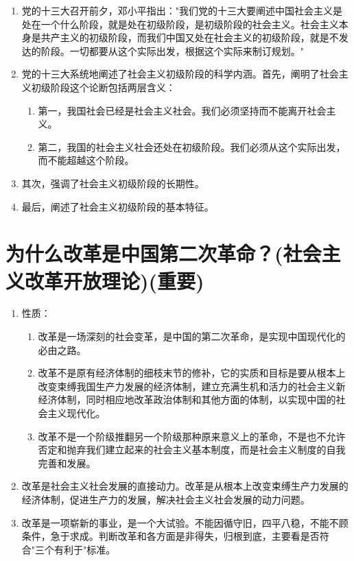 \documentclass[12pt, a4paper, oneside]{ctexbook}
\begin{document}
\begin{enumerate}[label=（\arabic*）]
\item 党的十三大召开前夕，邓小平指出："我们党的十三大要阐述中国社会主义是处在一个什么阶段，就是处在初级阶段，是初级阶段的社会主义。社会主义本身是共产主义的初级阶段，而我们中国又处在社会主义的初级阶段，就是不发达的阶段。一切都要从这个实际出发，根据这个实际来制订规划。"

\item 党的十三大系统地阐述了社会主义初级阶段的科学内涵。首先，阐明了社会主义初级阶段这个论断包括两层含义：

\begin{enumerate}[label=（\roman*）]
\item 第一，我国社会已经是社会主义社会。我们必须坚持而不能离开社会主义。

\item 第二，我国的社会主义社会还处在初级阶段。我们必须从这个实际出发，而不能超越这个阶段。
\end{enumerate}

\item 其次，强调了社会主义初级阶段的长期性。

\item 最后，阐述了社会主义初级阶段的基本特征。
\end{enumerate}

\section{为什么改革是中国第二次革命？(社会主义改革开放理论)(重要)}

\begin{enumerate}[label=（\arabic*）]
\item 性质：
\begin{enumerate}[label=（\roman*）]
\item 改革是一场深刻的社会变革，是中国的第二次革命，是实现中国现代化的必由之路。

\item 改革不是原有经济体制的细枝末节的修补，它的实质和目标是要从根本上改变束缚我国生产力发展的经济体制，建立充满生机和活力的社会主义新经济体制，同时相应地改革政治体制和其他方面的体制，以实现中国的社会主义现代化。

\item 改革不是一个阶级推翻另一个阶级那种原来意义上的革命，不是也不允许否定和抛弃我们建立起来的社会主义基本制度，而是社会主义制度的自我完善和发展。
\end{enumerate}

\item 改革是社会主义社会发展的直接动力。改革是从根本上改变束缚生产力发展的经济体制，促进生产力的发展，解决社会主义社会发展的动力问题。

\item 改革是一项崭新的事业，是一个大试验。不能因循守旧，四平八稳，不能不顾条件，急于求成。判断改革和各方面是非得失，归根到底，主要看是否符合"三个有利于"标准。
\end{enumerate}
\end{document}
